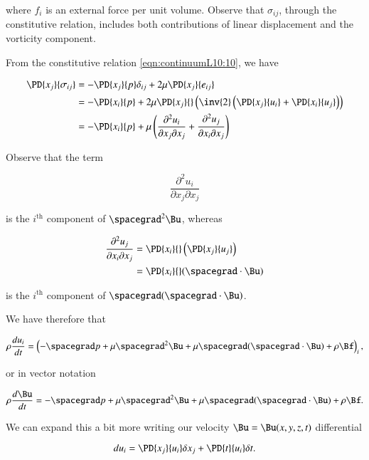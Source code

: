 where $f_i$ is an external force per unit volume.  Observe that $\sigma_{ij}$, through the constitutive relation, includes both contributions of linear displacement and the vorticity component.  

From the constitutive relation \ref{eqn:continuumL10:10}, we have

\begin{align*}
\PD{x_j}{\sigma_{ij}} 
&= - \PD{x_j}{p} \delta_{ij} + 2 \mu \PD{x_j}{e_{ij}} \\
&= - \PD{x_i}{p} + 2 \mu \PD{x_j}{} \left( 
\inv{2} \left(
 \PD{x_j}{u_i}
+ \PD{x_i}{u_j}
\right)
\right) \\
&= - \PD{x_i}{p} + \mu \left(
\frac{\partial^2 u_i}{\partial x_j \partial x_j}
+\frac{\partial^2 u_j}{\partial x_i \partial x_j}
\right) 
\end{align*}

Observe that the term

\begin{equation}\label{eqn:continuumL10:190}
\frac{\partial^2 u_i}{\partial x_j \partial x_j}
\end{equation}

is the $i^{\text{th}}$ component of $\spacegrad^2 \Bu$, whereas

\begin{align*}
\frac{\partial^2 u_j}{\partial x_i \partial x_j} 
&= \PD{x_i}{} \left( \PD{x_j}{u_j} \right) \\
&= \PD{x_i}{} (\spacegrad \cdot \Bu)
\end{align*}

is the $i^{\text{th}}$ component of $\spacegrad (\spacegrad \cdot \Bu)$.

We have therefore that 

\begin{equation}\label{eqn:continuumL10:210}
\rho \frac{du_i}{dt} = \left( -\spacegrad p + \mu \spacegrad^2 \Bu 
+ \mu \spacegrad (\spacegrad \cdot \Bu) + \rho \Bf
\right)_i,
\end{equation}

or in vector notation

\begin{equation}\label{eqn:continuumL10:230}
\rho \frac{d\Bu}{dt} = -\spacegrad p + \mu \spacegrad^2 \Bu 
+ \mu \spacegrad (\spacegrad \cdot \Bu) + \rho \Bf.
\end{equation}

We can expand this a bit more writing our velocity $\Bu = \Bu(x, y, z, t)$ differential 

\begin{equation}\label{eqn:continuumL10:250}
du_i = \PD{x_j}{u_i} \delta x_j + \PD{t}{u_i} \delta t.
\end{equation}

